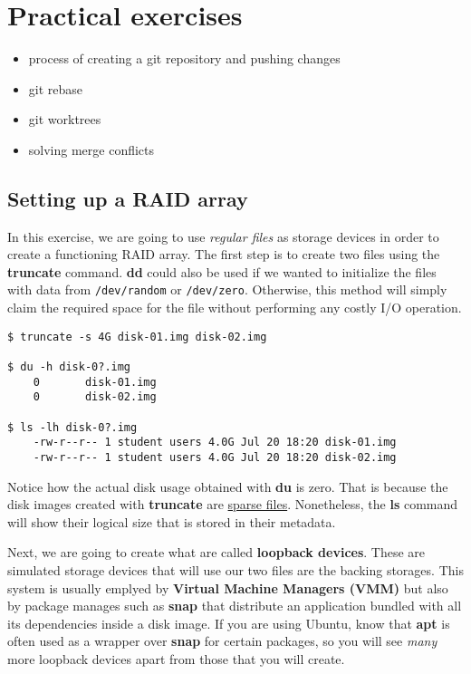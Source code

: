 \newpage

\section{Practical exercises}

\begin{itemize}
    \item process of creating a git repository and pushing changes
    \item git rebase
    \item git worktrees
    \item solving merge conflicts
\end{itemize}

\subsection{Setting up a RAID array}

In this exercise, we are going to use \textit{regular files} as storage devices
in order to create a functioning RAID array. The first step is to create two
files using the \textbf{truncate} command. \textbf{dd} could also be used if we
wanted to initialize the files with data from \texttt{/dev/random} or
\texttt{/dev/zero}. Otherwise, this method will simply claim the required space
for the file without performing any costly I/O operation.

\begin{lstlisting}[style=bashstyle]
$ truncate -s 4G disk-01.img disk-02.img

$ du -h disk-0?.img
    0       disk-01.img
    0       disk-02.img

$ ls -lh disk-0?.img
    -rw-r--r-- 1 student users 4.0G Jul 20 18:20 disk-01.img
    -rw-r--r-- 1 student users 4.0G Jul 20 18:20 disk-02.img
\end{lstlisting}

Notice how the actual disk usage obtained with \textbf{du} is zero. That is
because the disk images created with \textbf{truncate} are
\href{https://wiki.archlinux.org/title/Sparse_file}{sparse files}. Nonetheless,
the \textbf{ls} command will show their logical size that is stored in their
metadata.

Next, we are going to create what are called \textbf{loopback devices}. These
are simulated storage devices that will use our two files are the backing
storages. This system is usually emplyed by \textbf{Virtual Machine Managers
(VMM)} but also by package manages such as \textbf{snap} that distribute an
application bundled with all its dependencies inside a disk image. If you are
using Ubuntu, know that \textbf{apt} is often used as a wrapper over
\textbf{snap} for certain packages, so you will see \textit{many} more loopback
devices apart from those that you will create.

